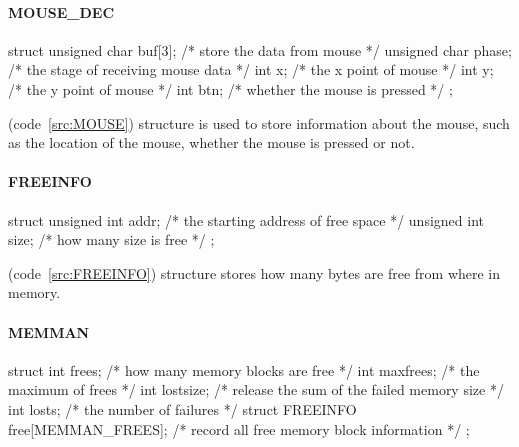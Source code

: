 \documentclass{swfcthesis}
\begin{document}
\paragraph{MOUSE\_DEC}

\begin{listing}[H]
  \begin{codeblock}
\begin{ccode}
struct 
{ 
  unsigned char buf[3]; /* store the data from mouse */
  unsigned char phase;  /* the stage of receiving mouse data */
  int x;                /* the x point of mouse */
  int y;                /* the y point of mouse */
  int btn;              /* whether the mouse is pressed */
};
\end{ccode}
  \end{codeblock}
  \caption{\emph{struct MOUSE\_DEC}}\label{src:MOUSE}
\end{listing}

(code~\ref{src:MOUSE}) structure is used to store information about the mouse, such as the
location of the mouse, whether the mouse is pressed or not.

\paragraph{FREEINFO}

\begin{listing}[H]
  \begin{codeblock}
\begin{ccode}
struct 
{ 
  unsigned int addr; /* the starting address of free space */
  unsigned int size; /* how many size is free */
};
\end{ccode}
  \end{codeblock}
  \caption{\emph{struct FREEINFO}}\label{src:FREEINFO}
\end{listing}

(code~\ref{src:FREEINFO}) structure stores how many bytes are
free from where in memory.




\paragraph{MEMMAN}

\begin{listing}[H]
  \begin{codeblock}
\begin{ccode}
struct 
{ 
  int frees;                           /* how many memory blocks are free */
  int maxfrees;                        /* the maximum of frees */
  int lostsize;                        /* release the sum of the failed memory size */
  int losts;                           /* the number of failures */
  struct FREEINFO free[MEMMAN_FREES];  /* record all free memory block information */
};
\end{ccode}
  \end{codeblock}
  \caption{\emph{struct MEMMAN}}\label{src:MEMMAN}
\end{listing}
\end{document}
